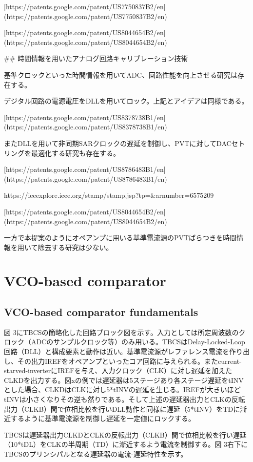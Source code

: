 \documentclass[letterpaper, 10 pt, conference]{ieeeconf}  %
\begin{document}
[https://patents.google.com/patent/US7750837B2/en](https://patents.google.com/patent/US7750837B2/en)

[https://patents.google.com/patent/US8044654B2/en](https://patents.google.com/patent/US8044654B2/en)

## 時間情報を用いたアナログ回路キャリブレーション技術

基準クロックといった時間情報を用いてADC、回路性能を向上させる研究は存在する。

デジタル回路の電源電圧をDLLを用いてロック。上記とアイデアは同様である。

[https://patents.google.com/patent/US8378738B1/en](https://patents.google.com/patent/US8378738B1/en)

またDLLを用いて非同期SARクロックの遅延を制御し、PVTに対してDACセトリングを最適化する研究も存在する。

[https://patents.google.com/patent/US8786483B1/en](https://patents.google.com/patent/US8786483B1/en)

https://ieeexplore.ieee.org/stamp/stamp.jsp?tp=&arnumber=6575209

[https://patents.google.com/patent/US8044654B2/en](https://patents.google.com/patent/US8044654B2/en)

一方で本提案のようにオペアンプに用いる基準電流源のPVTばらつきを時間情報を用いて除去する研究は少ない。

\section{VCO-based comparator}
\subsection{VCO-based comparator fundamentals}

図 3にTBCSの簡略化した回路ブロック図を示す。入力としては所定周波数のクロック（ADCのサンプルクロック等）のみ用いる。TBCSはDelay-Locked-Loop回路（DLL）と構成要素と動作は近い。基準電流源がレファレンス電流を作り出し、その出力IREFをオペアンプといったコア回路に与えられる。またcurrent-starved-inverterにIREFを与え、入力クロック（CLK）に対し遅延を加えたCLKDを出力する。図xの例では遅延器は5ステージあり各ステージ遅延をtINVとした場合、CLKDはCLKに対し5*tINVの遅延を生じる。IREFが大きいほどtINVは小さくなりその逆も然りである。そして上述の遅延器出力とCLKの反転出力（CLKB）間で位相比較を行いDLL動作と同様に遅延（5*tINV）をTDに漸近するように基準電流源を制御し遅延を一定値にロックする。


TBCSは遅延器出力CLKDとCLKの反転出力（CLKB）間で位相比較を行い遅延（10*tDL）をCLKの半周期（TD）に漸近するよう電流を制御する。図 3右下にTBCSのプリンシパルとなる遅延器の電流-遅延特性を示す。
\end{document}
